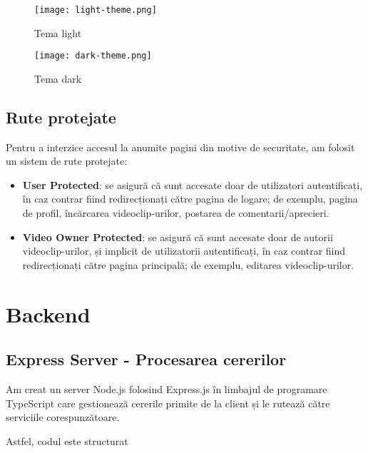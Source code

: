 \begin{figure}[h]
    \centering
    \begin{minipage}{0.49\textwidth}
        \centering
        \texttt{[image: light-theme.png]}
        \caption{Tema light}
        \label{fig:light-theme}
    \end{minipage}\hfill
    \begin{minipage}{0.49\textwidth}
        \centering
        \texttt{[image: dark-theme.png]}
        \caption{Tema dark}
        \label{fig:dark-theme}
    \end{minipage}
\end{figure}

\subsection{Rute protejate}
Pentru a interzice accesul la anumite pagini din motive de securitate, am folosit un sistem
de rute protejate:
\begin{itemize}
    \item \textbf{User Protected}: se asigură că sunt accesate doar de utilizatori autentificați,
    în caz contrar fiind redirecționați către pagina de logare; de exemplu, pagina de profil,
    încărcarea videoclip-urilor, postarea de comentarii/aprecieri.
    \item \textbf{Video Owner Protected}: se asigură că sunt accesate doar de autorii videoclip-urilor,
    și implicit de utilizatorii autentificați, în caz contrar fiind redirecționați către pagina principală;
    de exemplu, editarea videoclip-urilor.
\end{itemize}

\section{Backend}

\subsection{Express Server - Procesarea cererilor}
Am creat un server Node.js folosind Express.js în limbajul de programare TypeScript care
gestionează cererile primite de la client și le rutează către serviciile corespunzătoare.
\par
Astfel, codul este structurat 

